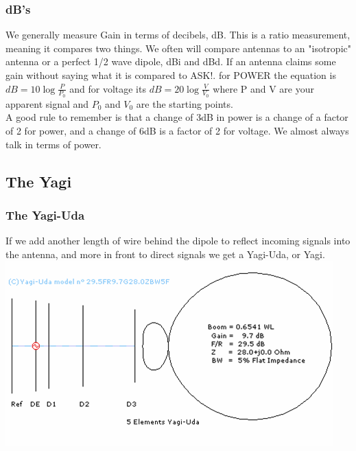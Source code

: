 \documentclass[10pt]{beamer}
\begin{document}
\begin{frame}
\frametitle{dB's}
We generally measure Gain in terms of decibels, dB. This is a ratio measurement, meaning it compares two things. We often will compare antennas to an "isotropic" antenna or a perfect 1/2 wave dipole, dBi and dBd. If an antenna claims some gain without saying what it is compared to ASK!. for POWER the equation is $dB=10\log\frac{P}{P_0}$ and for voltage its $dB=20\log\frac{V}{V_0}$ where P and V are your apparent signal and $P_0$ and $V_0$ are the starting points.\\
A good rule to remember is that a change of 3dB in power is a change of a factor of 2 for power, and a change of 6dB is a factor of 2 for voltage. We almost always talk in terms of power.
\end{frame}

\subsection{The Yagi}
\begin{frame}
\frametitle{The Yagi-Uda}
If we add another length of wire behind the dipole to reflect incoming signals into the antenna, and more in front to direct signals we get a Yagi-Uda, or Yagi.\\
\includegraphics[height=.5\textheight]{yagi.png}
\end{frame}
\end{document}
